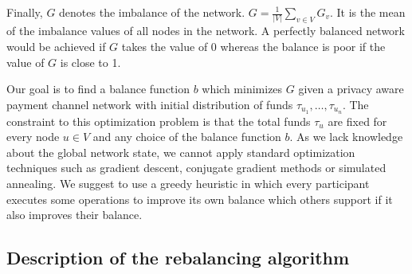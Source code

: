 \documentclass[conference]{IEEEtran}
\begin{document}
Finally, $G$ denotes the imbalance of the network. $G = \displaystyle{\frac{1}{|V|}\sum_{v\in V}G_v}$. It is the mean of the imbalance values of all nodes in the network.
A perfectly balanced network would be achieved if $G$ takes the value of $0$ whereas the balance is poor if the value of $G$ is close to 1.

Our goal is to find a balance function $b$ which minimizes $G$ given a privacy aware payment channel network with initial distribution of funds $\tau_{u_1},\dots,\tau_{u_n}$.
The constraint to this optimization problem is that the total funds $\tau_u$ are fixed for every node $u \in V$ and any choice of the balance function $b$.
As we lack knowledge about the global network state, we cannot apply standard optimization techniques such as gradient descent, conjugate gradient methods or simulated annealing.
We suggest to use a greedy heuristic in which every participant executes some operations to improve its own balance which others support if it also improves their balance.

\subsection{Description of the rebalancing algorithm}
\label{sec:Greedy Rebalancing Heuristic}
\end{document}
